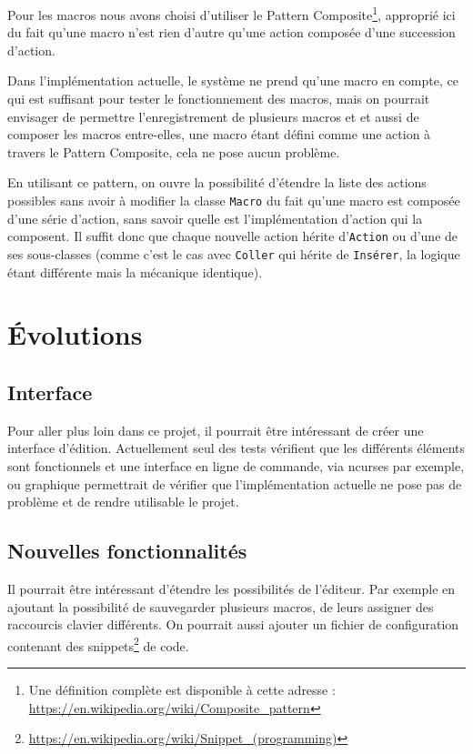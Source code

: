 \documentclass[french]{article}
\begin{document}
Pour les macros nous avons choisi d'utiliser le Pattern Composite\footnote{Une définition complète est disponible à cette adresse : \url{https://en.wikipedia.org/wiki/Composite_pattern}}, approprié ici du fait qu'une macro n'est rien d'autre qu'une action composée d'une succession d'action.

Dans l'implémentation actuelle, le système ne prend qu'une macro en compte, ce qui est suffisant pour tester le fonctionnement des macros, mais on pourrait envisager de permettre l'enregistrement de plusieurs macros et et aussi de composer les macros entre-elles, une macro étant défini comme une action à travers le Pattern Composite, cela ne pose aucun problème.

En utilisant ce pattern, on ouvre la possibilité d'étendre la liste des actions possibles sans avoir à modifier la classe \texttt{Macro} du fait qu'une macro est composée d'une série d'action, sans savoir quelle est l'implémentation d'action qui la composent. Il suffit donc que chaque nouvelle action hérite d'\texttt{Action} ou d'une de ses sous-classes (comme c'est le cas avec \texttt{Coller} qui hérite de \texttt{Insérer}, la logique étant différente mais la mécanique identique). 


\section{Évolutions}

\subsection{Interface}

Pour aller plus loin dans ce projet, il pourrait être intéressant de créer une interface d'édition. Actuellement seul des tests vérifient que les différents éléments sont fonctionnels et une interface en ligne de commande, via ncurses par exemple, ou graphique permettrait de vérifier que l'implémentation actuelle ne pose pas de problème et de rendre utilisable le projet.

\subsection{Nouvelles fonctionnalités}

Il pourrait être intéressant d'étendre les possibilités de l'éditeur. Par exemple en ajoutant la possibilité de sauvegarder plusieurs macros, de leurs assigner des raccourcis clavier différents. On pourrait aussi ajouter un fichier de configuration contenant des snippets\footnote{\url{https://en.wikipedia.org/wiki/Snippet_(programming)}} de code. 
\end{document}
